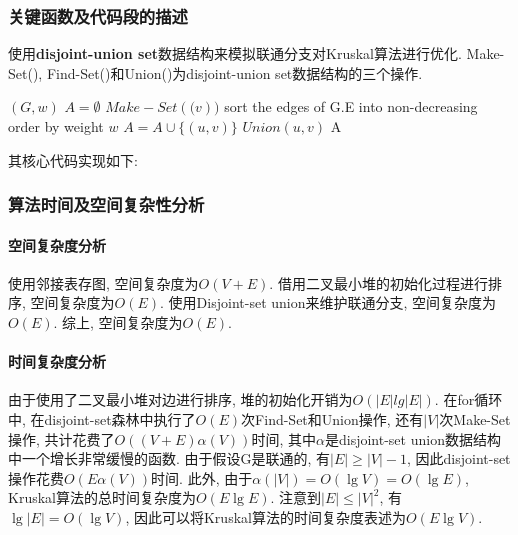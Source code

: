 \subsubsection{关键函数及代码段的描述}
使用\textbf{disjoint-union set}数据结构来模拟联通分支对Kruskal算法进行优化. Make-Set(),
Find-Set()和Union()为disjoint-union set数据结构的三个操作.
\begin{algorithm}
	\begin{algorithmic}{1}
		\Require $(G,w)$
		\State $A = \emptyset$
		\State $Make-Set(\mathit(v))$
		sort the edges of G.E into non-decreasing order by weight $\mathit{w}$
		\EndFor
		\State $A = A\cup \{(\mathit{u,v})\}$
		\State $Union(\mathit{u,v})$
		\EndIf
		\EndFor
		\return A
	\end{algorithmic}
\end{algorithm}


其核心代码实现如下:


\subsubsection{算法时间及空间复杂性分析}
\paragraph{空间复杂度分析}
使用邻接表存图, 空间复杂度为$O(V+E)$. 借用二叉最小堆的初始化过程进行排序,
空间复杂度为$O(E)$. 使用Disjoint-set union来维护联通分支, 空间复杂度为$O(E)$.
综上, 空间复杂度为$O(E)$.

\paragraph{时间复杂度分析}
由于使用了二叉最小堆对边进行排序, 堆的初始化开销为$O(|E|lg|E|)$. 在for循环中,
在disjoint-set森林中执行了$O(E)$次Find-Set和Union操作, 还有$|V|$次Make-Set操作,
共计花费了$O((V+E)\alpha (V))$时间, 其中$\alpha$是disjoint-set
union数据结构中一个增长非常缓慢的函数. 由于假设G是联通的, 有$|E|\geq |V|-1$,
因此disjoint-set操作花费$O(E\alpha (V))$时间. 此外, 由于$\alpha(|V|) = O(\lg V)
	= O(\lg E)$, Kruskal算法的总时间复杂度为$O(E\lg E)$. 注意到$|E|\leq |V|^2$,
有$\lg |E| = O(\lg V)$, 因此可以将Kruskal算法的时间复杂度表述为$O(E\lg V)$.


